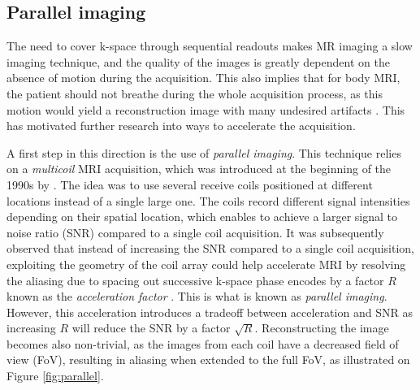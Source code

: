 


\subsection{Parallel imaging}

The need to cover k-space through sequential readouts makes MR imaging a slow imaging technique, and the quality of the images is greatly dependent on the absence of motion during the acquisition. This also implies that for body MRI, the patient should not breathe during the whole acquisition process, as this motion would yield a reconstruction image with many undesired artifacts \citep{glockner2005parallel}. This has motivated further research into ways to accelerate the acquisition.

A first step in this direction is the use of \textit{parallel imaging}. This technique relies on a \textit{multicoil} MRI acquisition, which was introduced at the beginning of the 1990s by \cite{roemer1990nmr}. The idea was to use several receive coils positioned at different locations instead of a single large one. The coils record different signal intensities depending on their spatial location, which enables to achieve a larger signal to noise ratio (SNR) compared to a single coil acquisition. 
It was subsequently observed that instead of increasing the SNR compared to a single coil acquisition, exploiting the geometry of the coil array could help accelerate MRI by resolving the aliasing due to spacing out successive k-space phase encodes by a factor $R$ known as the \textit{acceleration factor} \citep{sodickson1997simultaneous}. This is what is known as \textit{parallel imaging}. However, this acceleration introduces a tradeoff between acceleration and SNR as increasing $R$ will reduce the SNR by a factor $\sqrt{R}$. Reconstructing the image becomes also non-trivial, as the images from each coil have a decreased field of view (FoV), resulting in aliasing when extended to the full FoV, as illustrated on Figure \ref{fig:parallel}.

